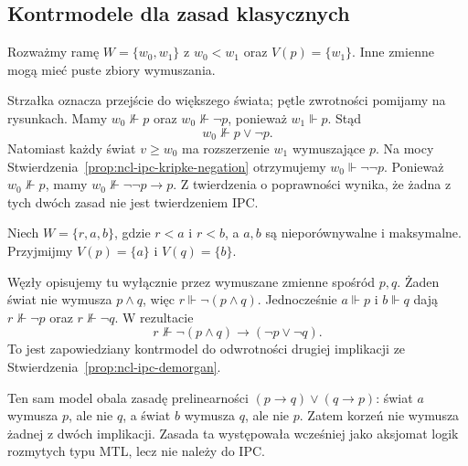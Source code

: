 \subsection{Kontrmodele dla zasad klasycznych}

\begin{przyklad}
\label{ex:ncl-ipc-two-world-countermodel}
Rozważmy ramę $W=\{w_0,w_1\}$ z $w_0<w_1$
oraz $V(p)=\{w_1\}$. Inne zmienne mogą mieć
puste zbiory wymuszania.
\begin{center}
\end{center}
Strzałka oznacza przejście do większego świata;
pętle zwrotności pomijamy na rysunkach.
Mamy $w_0\not\Vdash p$ oraz
$w_0\not\Vdash\neg p$, ponieważ $w_1\Vdash p$.
Stąd
\[
 w_0\not\Vdash p\vee\neg p.
\]
Natomiast każdy świat $v\geq w_0$ ma rozszerzenie
$w_1$ wymuszające $p$. Na mocy
Stwierdzenia~\ref{prop:ncl-ipc-kripke-negation}
otrzymujemy $w_0\Vdash\neg\neg p$.
Ponieważ $w_0\not\Vdash p$, mamy
$w_0\not\Vdash\neg\neg p\to p$.
Z twierdzenia o poprawności wynika, że żadna
z tych dwóch zasad nie jest twierdzeniem IPC.
\end{przyklad}

\begin{przyklad}
\label{ex:ncl-ipc-fork-countermodel}
Niech $W=\{r,a,b\}$, gdzie $r<a$ i $r<b$,
a $a,b$ są nieporównywalne i maksymalne.
Przyjmijmy $V(p)=\{a\}$ i $V(q)=\{b\}$.
\begin{center}
\end{center}
Węzły opisujemy tu wyłącznie przez wymuszane
zmienne spośród $p,q$. Żaden świat nie wymusza
$p\wedge q$, więc $r\Vdash\neg(p\wedge q)$.
Jednocześnie $a\Vdash p$ i $b\Vdash q$ dają
$r\not\Vdash\neg p$ oraz $r\not\Vdash\neg q$.
W rezultacie
\[
 r\not\Vdash
 \neg(p\wedge q)\to(\neg p\vee\neg q).
\]
To jest zapowiedziany kontrmodel do odwrotności
drugiej implikacji ze
Stwierdzenia~\ref{prop:ncl-ipc-demorgan}.

Ten sam model obala zasadę prelinearności
$(p\to q)\vee(q\to p)$: świat $a$ wymusza $p$,
ale nie $q$, a świat $b$ wymusza $q$, ale nie $p$.
Zatem korzeń nie wymusza żadnej z dwóch implikacji.
Zasada ta występowała wcześniej jako aksjomat
logik rozmytych typu MTL, lecz nie należy do IPC.
\end{przyklad}

